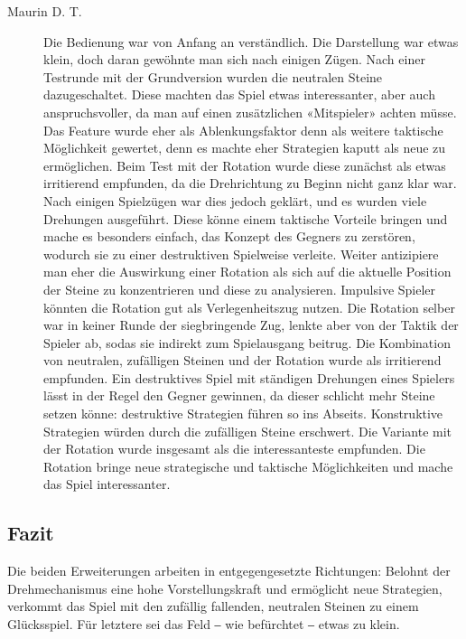 \documentclass[a4paper,11pt,hidelinks]{scrartcl}
\begin{document}
\begin{description}
    \item[Maurin D. T.] Die Bedienung war von Anfang an verständlich. Die Darstellung war etwas klein, doch daran gewöhnte man sich nach einigen Zügen. Nach einer Testrunde mit der Grundversion wurden die neutralen Steine dazugeschaltet. Diese machten das Spiel etwas interessanter, aber auch anspruchsvoller, da man auf einen zusätzlichen «Mitspieler» achten müsse. Das Feature wurde eher als Ablenkungsfaktor denn als weitere taktische Möglichkeit gewertet, denn es machte eher Strategien kaputt als neue zu ermöglichen. Beim Test mit der Rotation wurde diese zunächst als etwas irritierend empfunden, da die Drehrichtung zu Beginn nicht ganz klar war. Nach einigen Spielzügen war dies jedoch geklärt, und es wurden viele Drehungen ausgeführt. Diese könne einem taktische Vorteile bringen und mache es besonders einfach, das Konzept des Gegners zu zerstören, wodurch sie zu einer destruktiven Spielweise verleite. Weiter antizipiere man eher die Auswirkung einer Rotation als sich auf die aktuelle Position der Steine zu konzentrieren und diese zu analysieren. Impulsive Spieler könnten die Rotation gut als Verlegenheitszug nutzen. Die Rotation selber war in keiner Runde der siegbringende Zug, lenkte aber von der Taktik der Spieler ab, sodas sie indirekt zum Spielausgang beitrug. Die Kombination von neutralen, zufälligen Steinen und der Rotation wurde als irritierend empfunden. Ein destruktives Spiel mit ständigen Drehungen eines Spielers lässt in der Regel den Gegner gewinnen, da dieser schlicht mehr Steine setzen könne: destruktive Strategien führen so ins Abseits. Konstruktive Strategien würden durch die zufälligen Steine erschwert. Die Variante mit der Rotation wurde insgesamt als die interessanteste empfunden. Die Rotation bringe neue strategische und taktische Möglichkeiten und mache das Spiel interessanter.
\end{description}

\subsection{Fazit}

Die beiden Erweiterungen arbeiten in entgegengesetzte Richtungen: Belohnt der Drehmechanismus eine hohe Vorstellungskraft und ermöglicht neue Strategien, verkommt das Spiel mit den zufällig fallenden, neutralen Steinen zu einem Glücksspiel. Für letztere sei das Feld ‒ wie befürchtet ‒ etwas zu klein.

\newpage

\listoffigures
{}
\end{document}
